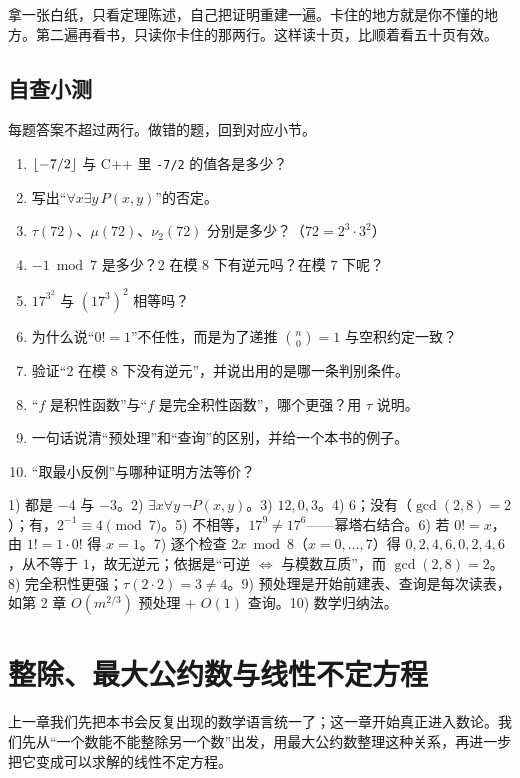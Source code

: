 \begin{tip}
拿一张白纸，只看定理陈述，自己把证明重建一遍。卡住的地方就是你不懂的地方。第二遍再看书，只读你卡住的那两行。这样读十页，比顺着看五十页有效。
\end{tip}

\section{自查小测}
每题答案不超过两行。做错的题，回到对应小节。

\begin{enumerate}
\item $\left\lfloor -7/2\right\rfloor$ 与 C++ 里 \texttt{-7/2} 的值各是多少？
\item 写出“$\forall x\exists y\,P(x,y)$”的否定。
\item $\tau(72)$、$\mu(72)$、$\nu_2(72)$ 分别是多少？（$72=2^3\cdot3^2$）
\item $-1\bmod 7$ 是多少？$2$ 在模 $8$ 下有逆元吗？在模 $7$ 下呢？
\item $17^{3^{2}}$ 与 $(17^3)^2$ 相等吗？
\item 为什么说“$0!=1$”不任性，而是为了递推 $\binom{n}{0}=1$ 与空积约定一致？
\item 验证“$2$ 在模 $8$ 下没有逆元”，并说出用的是哪一条判别条件。
\item “$f$ 是积性函数”与“$f$ 是完全积性函数”，哪个更强？用 $\tau$ 说明。
\item 一句话说清“预处理”和“查询”的区别，并给一个本书的例子。
\item “取最小反例”与哪种证明方法等价？
\end{enumerate}

\begin{tip}[参考答案]
1) 都是 $-4$ 与 $-3$。2) $\exists x\forall y\,\lnot P(x,y)$。3) $12,0,3$。4) $6$；没有（$\gcd(2,8)=2$）；有，$2^{-1}\equiv4\pmod 7$。5) 不相等，$17^{9}\ne17^{6}$——幂塔右结合。6) 若 $0!=x$，由 $1!=1\cdot0!$ 得 $x=1$。7) 逐个检查 $2x\bmod 8$（$x=0,\ldots,7$）得 $0,2,4,6,0,2,4,6$，从不等于 $1$，故无逆元；依据是“可逆 $\iff$ 与模数互质”，而 $\gcd(2,8)=2$。8) 完全积性更强；$\tau(2\cdot2)=3\ne4$。9) 预处理是开始前建表、查询是每次读表，如第 2 章 $O(m^{2/3})$ 预处理 + $O(1)$ 查询。10) 数学归纳法。
\end{tip}


\chapter{整除、最大公约数与线性不定方程}
\begin{chapterintro}[章节导读]
上一章我们先把本书会反复出现的数学语言统一了；这一章开始真正进入数论。我们先从“一个数能不能整除另一个数”出发，用最大公约数整理这种关系，再进一步把它变成可以求解的线性不定方程。
\end{chapterintro}

